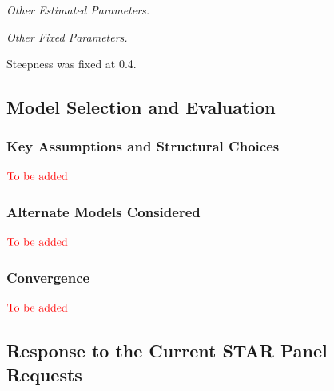 \documentclass[12pt,]{article}
\begin{document}
\emph{Other Estimated Parameters.}

\emph{Other Fixed Parameters.}

Steepness was fixed at 0.4.

\hypertarget{model-selection-and-evaluation}{%
\subsection{Model Selection and
Evaluation}\label{model-selection-and-evaluation}}

\hypertarget{key-assumptions-and-structural-choices}{%
\subsubsection{Key Assumptions and Structural
Choices}\label{key-assumptions-and-structural-choices}}

\textbf{\(\color{red}{\text{To be added}}\)}

\hypertarget{alternate-models-considered}{%
\subsubsection{Alternate Models
Considered}\label{alternate-models-considered}}

\textbf{\(\color{red}{\text{To be added}}\)}

\hypertarget{convergence}{%
\subsubsection{Convergence}\label{convergence}}

\textbf{\(\color{red}{\text{To be added}}\)}

\hypertarget{response-to-the-current-star-panel-requests}{%
\subsection{Response to the Current STAR Panel
Requests}\label{response-to-the-current-star-panel-requests}}
\end{document}
